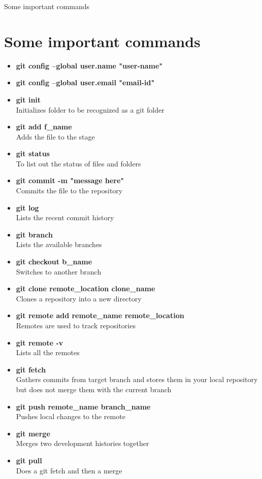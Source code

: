 \documentclass{beamer}
\begin{document}
\begin{frame}[allowframebreaks]{Some important commands}
\section{Some important commands}
\begin{adjustwidth}{-2em}{-2em}
\begin{itemize}
	\item {\textbf{git config --global user.name "user-name"}}
	\item {\textbf{git config --global user.email "email-id"}}
	
	\item {\textbf{git init} \\ Initializes folder to be recognized as a git folder}
	\item {\textbf{git add f\_name }\\ Adds the file to the stage}
	\item {\textbf{git status} \\ To list out the status of files and folders}
	\item {\textbf{git commit -m "message here"} \\ Commits the file to the repository}
	\item {\textbf{git log} \\ Lists the recent commit history}
	
	\item {\textbf{git branch} \\ Lists the available branches}
	\item {\textbf{git checkout b\_name} \\ Switches to another branch}	
\end{itemize}
	
	\begin{itemize}
		\item {\textbf{git clone remote\_location clone\_name} \\ Clones a repository into a new directory}
		\item {\textbf{git remote add remote\_name remote\_location} \\ Remotes are used to track repositories}
		\item {\textbf{git remote -v} \\ Lists all the remotes}
		
		\item {\textbf{git fetch }\\Gathers commits from target branch and stores them in your local repository but does not merge them with the current branch }
		\item {\textbf{git push remote\_name branch\_name}\\Pushes local changes to the remote }
		\item {\textbf{git merge} \\ Merges two development histories together}
		\item {\textbf{git pull}\\Does a git fetch and then a merge}
		

\end{itemize}
\end{adjustwidth}
\end{frame}
\end{document}
